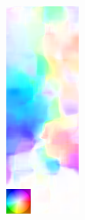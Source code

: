 \begin{figure}[!htb]
	\centering
	\begin{subfigure}[t]{0.3\columnwidth}
		\centering
		\includegraphics[width=\columnwidth, frame]{./Slike/stage2-field-of-svbv-flo-corrected.png}

\end{subfigure}
\end{figure}
